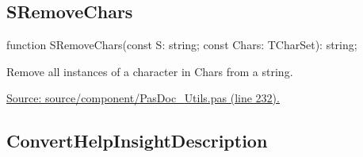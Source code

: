 \documentclass{report}
\newif\ifpdf
\begin{document}
\subsection*{SRemoveChars}
\fi
\label{PasDoc_Utils-SRemoveChars}
\begin{list}{}{
\setlength{\itemindent}{0cm}
\setlength{\listparindent}{0cm}
\setlength{\leftmargin}{\evensidemargin}
\addtolength{\leftmargin}{\tmplength}
\settowidth{\labelsep}{X}
\addtolength{\leftmargin}{\labelsep}
\setlength{\labelwidth}{\tmplength}
}
\item[\textbf{Declaration}\hfill]
\ifpdf
\begin{flushleft}
\fi
\begin{ttfamily}
function SRemoveChars(const S: string; const Chars: TCharSet): string;\end{ttfamily}

\ifpdf
\end{flushleft}
\fi

\par
\item[\textbf{Description}]
Remove all instances of a character in Chars from a string.\par
\href{https://github.com/pasdoc/pasdoc/blob/master/source/component/PasDoc_Utils.pas#L232}{Source: source/component/PasDoc{\_}Utils.pas (line 232).}

\end{list}
\ifpdf
\subsection*{\large{\textbf{ConvertHelpInsightDescription}}\normalsize\hspace{1ex}\hrulefill}
\else
\end{document}
